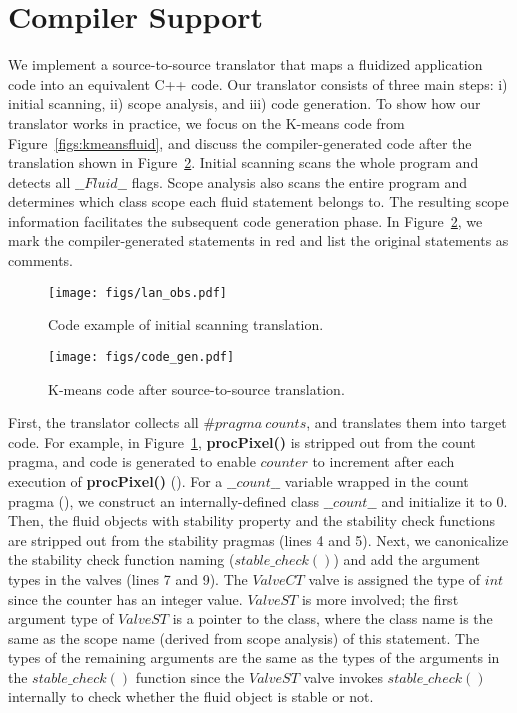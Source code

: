 \section{Compiler Support}
\label{sec:fluid_compiler}\label{sec:code-gen}
We implement a source-to-source translator that maps a fluidized application code into an equivalent C++ code.
Our translator consists of three main steps: i) initial scanning, ii) scope analysis, and iii) code generation. 
To show how our translator works in practice, we focus on the K-means code from Figure~\ref{figs:kmeansfluid}, and discuss the compiler-generated code after the translation shown in Figure~\ref{figs:code-gen}. Initial scanning scans the whole program and detects all $\_\_Fluid\_\_$ flags. Scope analysis also scans the entire program and determines which class scope each fluid statement belongs to. The resulting scope information facilitates the subsequent code generation phase. In Figure~\ref{figs:code-gen}, we mark the compiler-generated statements in red and list the original statements as comments. 


\begin{figure}
\centering
\texttt{[image: figs/lan\_obs.pdf]}
\vspace{-10pt}\caption{Code example of initial scanning translation.}\label{figs:lan-obs}\vspace{-12pt}
\end{figure}

\begin{figure}
\centering
\texttt{[image: figs/code\_gen.pdf]}
\vspace{-8pt}\caption{K-means code after source-to-source translation.}\label{figs:code-gen}\vspace{-16pt}
\end{figure}
First, the translator collects all $\#pragma\ counts$, and translates them into target code. For example, in Figure~\ref{figs:lan-obs}, \textbf{procPixel()} is stripped out from the count pragma, and code is generated to enable $counter$ to increment after each execution of \textbf{procPixel()} (). For a $\_\_count\_\_$ variable wrapped in the count pragma (), we construct an internally-defined class $\_\_count\_\_$ and initialize it to 0. Then, the fluid objects with stability property and the stability check functions are stripped out from the stability pragmas (lines 4 and 5).  Next, we canonicalize the stability check function naming ($stable\_check()$) and add the argument types in the valves (lines 7 and 9). The $ValveCT$ valve is assigned the type of $int$ since the counter has an integer value. $ValveST$ is more involved; the first argument type of $ValveST$ is a pointer to the class, where the class name is the same as the scope name (derived from scope analysis) of this statement. The types of the remaining arguments are the same as the types of the arguments in the $stable\_check()$ function since the $ValveST$ valve invokes $stable\_check()$ internally to check whether the fluid object is stable or not.

